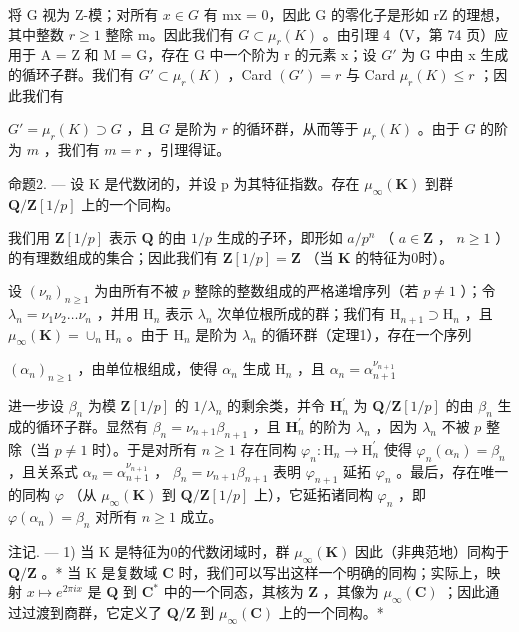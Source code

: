 将 G 视为 Z-模；对所有 \(x \in G\) 有 mx = 0，因此 G 的零化子是形如 rZ 的理想，其中整数 \(r \geqslant 1\) 整除 m。因此我们有 \(G \subset \mu_{r}(K)\) 。由引理 4（V，第 74 页）应用于 A = Z 和 M = G，存在 G 中一个阶为 r 的元素 x；设 \(G'\) 为 G 中由 x 生成的循环子群。我们有 \(G' \subset \mu_{r}(K)\) ，Card \((G') = r\) 与 Card \(\mu_{r}(K) \leqslant r\) ；因此我们有

\(G' = \mu_r(K) \supset G\) ，且 \(G\) 是阶为 \(r\) 的循环群，从而等于 \(\mu_r(K)\) 。由于 \(G\) 的阶为 \(m\) ，我们有 \(m = r\) ，引理得证。

命题2. --- 设 K 是代数闭的，并设 p 为其特征指数。存在 \(\mu_{\infty}(\mathbf{K})\) 到群 \(\mathbf{Q}/\mathbf{Z}[1/p]\) 上的一个同构。

我们用 \(\mathbf{Z}[1/p]\) 表示 \(\mathbf{Q}\) 的由 \(1/p\) 生成的子环，即形如 \(a/p^n\) （ \(a \in \mathbf{Z}\) ， \(n \geqslant 1\) ）的有理数组成的集合；因此我们有 \(\mathbf{Z}[1/p] = \mathbf{Z}\) （当 \(\mathbf{K}\) 的特征为0时）。

设 \((\nu_{n})_{n\geqslant 1}\) 为由所有不被 \(p\) 整除的整数组成的严格递增序列（若 \(p\neq 1\) ）；令 \(\lambda_{n} = \nu_{1}\nu_{2}\dots \nu_{n}\) ，并用 \(\mathrm{H}_n\) 表示 \(\lambda_{n}\) 次单位根所成的群；我们有 \(\mathrm{H}_{n + 1}\supset \mathrm{H}_n\) ，且 \(\mu_{\infty}(\mathbf{K}) = \cup_{n}\mathrm{H}_{n}\) 。由于 \(\mathrm{H}_n\) 是阶为 \(\lambda_{n}\) 的循环群（定理1），存在一个序列

\((\alpha_{n})_{n\geqslant 1}\) ，由单位根组成，使得 \(\alpha_{n}\) 生成 \(\mathrm{H}_n\) ，且 \(\alpha_{n} = \alpha_{n + 1}^{\nu_{n + 1}}\)

进一步设 \(\beta_{n}\) 为模 \(\mathbf{Z}[1/p]\) 的 \(1/\lambda_{n}\) 的剩余类，并令 \(\mathbf{H}_{n}^{\prime}\) 为 \(\mathbf{Q}/\mathbf{Z}[1/p]\) 的由 \(\beta_{n}\) 生成的循环子群。显然有 \(\beta_{n} = \nu_{n+1}\beta_{n+1}\) ，且 \(\mathbf{H}_{n}^{\prime}\) 的阶为 \(\lambda_{n}\) ，因为 \(\lambda_{n}\) 不被 \(p\) 整除（当 \(p \neq 1\) 时）。于是对所有 \(n \geqslant 1\) 存在同构 \(\varphi_{n}: \mathrm{H}_{n} \to \mathrm{H}_{n}^{\prime}\) 使得 \(\varphi_{n}(\alpha_{n}) = \beta_{n}\) ，且关系式 \(\alpha_{n} = \alpha_{n+1}^{\nu_{n+1}}\) ， \(\beta_{n} = \nu_{n+1}\beta_{n+1}\) 表明 \(\varphi_{n+1}\) 延拓 \(\varphi_{n}\) 。最后，存在唯一的同构 \(\varphi\) （从 \(\mu_{\infty}(\mathbf{K})\) 到 \(\mathbf{Q}/\mathbf{Z}[1/p]\) 上），它延拓诸同构 \(\varphi_{n}\) ，即 \(\varphi(\alpha_{n}) = \beta_{n}\) 对所有 \(n \geqslant 1\) 成立。

注记. --- 1) 当 K 是特征为0的代数闭域时，群 \(\mu_{\infty}(\mathbf{K})\) 因此（非典范地）同构于 \(\mathbf{Q}/\mathbf{Z}\) 。* 当 K 是复数域 \(\mathbf{C}\) 时，我们可以写出这样一个明确的同构；实际上，映射 \(x \mapsto e^{2\pi ix}\) 是 \(\mathbf{Q}\) 到 \(\mathbf{C}^*\) 中的一个同态，其核为 \(\mathbf{Z}\) ，其像为 \(\mu_{\infty}(\mathbf{C})\) ；因此通过过渡到商群，它定义了 \(\mathbf{Q}/\mathbf{Z}\) 到 \(\mu_{\infty}(\mathbf{C})\) 上的一个同构。*

